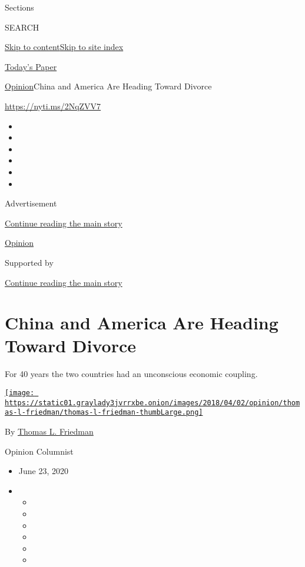 Sections

SEARCH

\protect\hyperlink{site-content}{Skip to
content}\protect\hyperlink{site-index}{Skip to site index}

\href{https://myaccount.nytimes3xbfgragh.onion/auth/login?response_type=cookie\&client_id=vi}{}

\href{https://www.nytimes3xbfgragh.onion/section/todayspaper}{Today's
Paper}

\href{/section/opinion}{Opinion}\textbar{}China and America Are Heading
Toward Divorce

\url{https://nyti.ms/2NqZVV7}

\begin{itemize}
\item
\item
\item
\item
\item
\item
\end{itemize}

Advertisement

\protect\hyperlink{after-top}{Continue reading the main story}

\href{/section/opinion}{Opinion}

Supported by

\protect\hyperlink{after-sponsor}{Continue reading the main story}

\hypertarget{china-and-america-are-heading-toward-divorce}{%
\section{China and America Are Heading Toward
Divorce}\label{china-and-america-are-heading-toward-divorce}}

For 40 years the two countries had an unconscious economic coupling.

\href{https://www.nytimes3xbfgragh.onion/by/thomas-l-friedman}{\texttt{[image: https://static01.graylady3jvrrxbe.onion/images/2018/04/02/opinion/thomas-l-friedman/thomas-l-friedman-thumbLarge.png]}}

By \href{https://www.nytimes3xbfgragh.onion/by/thomas-l-friedman}{Thomas
L. Friedman}

Opinion Columnist

\begin{itemize}
\item
  June 23, 2020
\item
  \begin{itemize}
  \item
  \item
  \item
  \item
  \item
  \item
  \end{itemize}
\end{itemize}

